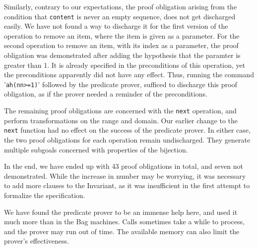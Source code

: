 \documentclass[12pt,journal,duplex]{IEEEtran}
\begin{document}
	Similarly, contrary to our expectations, the proof obligation arising from the condition that \texttt{content} is never an empty sequence, does not get discharged easily. We have not found a way to discharge it for the first version of the operation to remove an item, where the item is given as a parameter. For the second operation to remove an item, with its index as a parameter, the proof obligation was demonstrated after adding the hypothesis that the paramter is greater than 1. It is already specified in the preconditions of this operation, yet the preconditions apparently did not have any effect. Thus, running the command '\texttt{ah(nn>=1)}' followed by the predicate prover, sufficed to discharge this proof obligation, as if the prover needed a reminder of the preconditions.

	The remaining proof obligations are concerned with the \texttt{next} operation, and perform transformations on the range and domain.  Our earlier change to the \texttt{next} function had no effect on the success of the predicate prover. In either case, the two proof obligations for each operation remain undischarged.  They generate multiple subgoals concerned with properties of the bijection.

	In the end, we have ended up with 43 proof obligations in total, and seven not demonstrated. While the increase in number may be worrying, it was necessary to add more clauses to the Invariant, as it was insufficient in the first attempt to formalize the specification.

	We have found the predicate prover to be an immense help here, and used it much more than in the Bag machines. Calls sometimes take a while to process, and the prover may run out of time. The available memory can also limit the prover's effectiveness.
\end{document}
